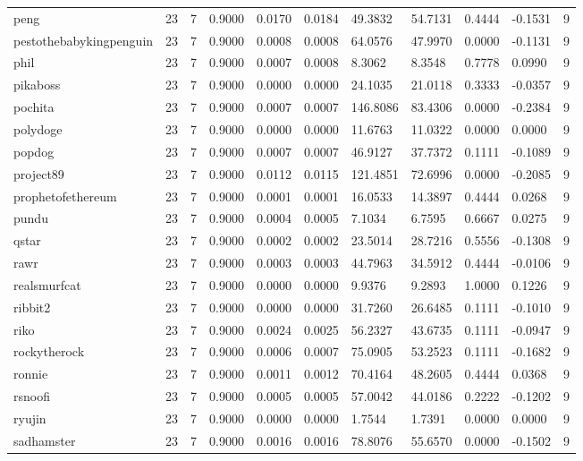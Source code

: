 \begin{table}[htbp]
\begin{tabular}{lllllllllll}
peng & 23 & 7 & 0.9000 & 0.0170 & 0.0184 & 49.3832 & 54.7131 & 0.4444 & -0.1531 & 9 \\
pestothebabykingpenguin & 23 & 7 & 0.9000 & 0.0008 & 0.0008 & 64.0576 & 47.9970 & 0.0000 & -0.1131 & 9 \\
phil & 23 & 7 & 0.9000 & 0.0007 & 0.0008 & 8.3062 & 8.3548 & 0.7778 & 0.0990 & 9 \\
pikaboss & 23 & 7 & 0.9000 & 0.0000 & 0.0000 & 24.1035 & 21.0118 & 0.3333 & -0.0357 & 9 \\
pochita & 23 & 7 & 0.9000 & 0.0007 & 0.0007 & 146.8086 & 83.4306 & 0.0000 & -0.2384 & 9 \\
polydoge & 23 & 7 & 0.9000 & 0.0000 & 0.0000 & 11.6763 & 11.0322 & 0.0000 & 0.0000 & 9 \\
popdog & 23 & 7 & 0.9000 & 0.0007 & 0.0007 & 46.9127 & 37.7372 & 0.1111 & -0.1089 & 9 \\
project89 & 23 & 7 & 0.9000 & 0.0112 & 0.0115 & 121.4851 & 72.6996 & 0.0000 & -0.2085 & 9 \\
prophetofethereum & 23 & 7 & 0.9000 & 0.0001 & 0.0001 & 16.0533 & 14.3897 & 0.4444 & 0.0268 & 9 \\
pundu & 23 & 7 & 0.9000 & 0.0004 & 0.0005 & 7.1034 & 6.7595 & 0.6667 & 0.0275 & 9 \\
qstar & 23 & 7 & 0.9000 & 0.0002 & 0.0002 & 23.5014 & 28.7216 & 0.5556 & -0.1308 & 9 \\
rawr & 23 & 7 & 0.9000 & 0.0003 & 0.0003 & 44.7963 & 34.5912 & 0.4444 & -0.0106 & 9 \\
realsmurfcat & 23 & 7 & 0.9000 & 0.0000 & 0.0000 & 9.9376 & 9.2893 & 1.0000 & 0.1226 & 9 \\
ribbit2 & 23 & 7 & 0.9000 & 0.0000 & 0.0000 & 31.7260 & 26.6485 & 0.1111 & -0.1010 & 9 \\
riko & 23 & 7 & 0.9000 & 0.0024 & 0.0025 & 56.2327 & 43.6735 & 0.1111 & -0.0947 & 9 \\
rockytherock & 23 & 7 & 0.9000 & 0.0006 & 0.0007 & 75.0905 & 53.2523 & 0.1111 & -0.1682 & 9 \\
ronnie & 23 & 7 & 0.9000 & 0.0011 & 0.0012 & 70.4164 & 48.2605 & 0.4444 & 0.0368 & 9 \\
rsnoofi & 23 & 7 & 0.9000 & 0.0005 & 0.0005 & 57.0042 & 44.0186 & 0.2222 & -0.1202 & 9 \\
ryujin & 23 & 7 & 0.9000 & 0.0000 & 0.0000 & 1.7544 & 1.7391 & 0.0000 & 0.0000 & 9 \\
sadhamster & 23 & 7 & 0.9000 & 0.0016 & 0.0016 & 78.8076 & 55.6570 & 0.0000 & -0.1502 & 9 \\

\end{tabular}
\end{table}
